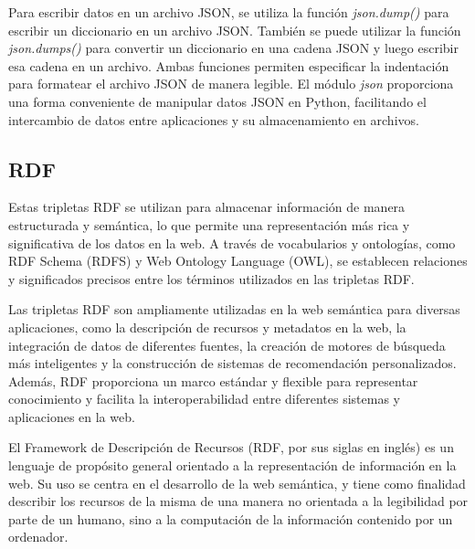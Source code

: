 Para escribir datos en un archivo JSON, se utiliza la función \textit{json.dump()} para escribir un diccionario en un archivo JSON. También se puede utilizar la función \textit{json.dumps()} para convertir un diccionario en una cadena JSON y luego escribir esa cadena en un archivo. Ambas funciones permiten especificar la indentación para formatear el archivo JSON de manera legible. El módulo \textit{json} proporciona una forma conveniente de manipular datos JSON en Python, facilitando el intercambio de datos entre aplicaciones y su almacenamiento en archivos.

\subsection{RDF}


Estas tripletas RDF se utilizan para almacenar información de manera estructurada y semántica, lo que permite una representación más rica y significativa de los datos en la web. A través de vocabularios y ontologías, como RDF Schema (RDFS) y Web Ontology Language (OWL), se establecen relaciones y significados precisos entre los términos utilizados en las tripletas RDF.

Las tripletas RDF son ampliamente utilizadas en la web semántica para diversas aplicaciones, como la descripción de recursos y metadatos en la web, la integración de datos de diferentes fuentes, la creación de motores de búsqueda más inteligentes y la construcción de sistemas de recomendación personalizados. Además, RDF proporciona un marco estándar y flexible para representar conocimiento y facilita la interoperabilidad entre diferentes sistemas y aplicaciones en la web.

	
El Framework de Descripción de Recursos (RDF, por sus siglas en inglés) es un lenguaje de propósito general orientado a la representación de información en la web. Su uso se centra en el desarrollo de la web semántica, y tiene como finalidad describir los recursos de la misma de una manera no orientada a la legibilidad por parte de un humano, sino a la computación de la información contenido por un ordenador.

